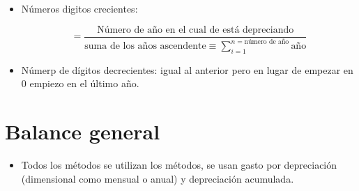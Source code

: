 \begin{itemize}
    
    \item Números digitos crecientes:
        \begin{center}
            \[
               = \frac{\text{Número de año en el cual de está depreciando}}{\text{suma de los años ascendente} \equiv  \sum_{i=1}^{n=\text{número de año}}\text{año}}
            \]
        \end{center}
    
    
    \item Númerp de dígitos decrecientes: igual al anterior pero en lugar de empezar en 0 empiezo en el último año.
\end{itemize}

\section{Balance general}
\begin{itemize}
    \item Todos los métodos se utilizan los métodos, se usan gasto por depreciación (dimensional como mensual o anual) y depreciación acumulada.
\end{itemize}
